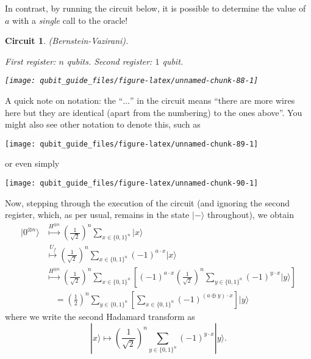 \documentclass[fleqn]{article}
\newtheorem*{circuit}{Circuit}
\begin{document}
In contrast, by running the circuit below, it is possible to determine the value of \(a\) with a \emph{single} call to the oracle!

\begin{circuit}

(Bernstein-Vazirani).

\emph{First register: \(n\) qubits. Second register: \(1\) qubit.}

\begin{center}\texttt{[image: qubit\_guide\_files/figure-latex/unnamed-chunk-88-1]} \end{center}

\end{circuit}

A quick note on notation: the ``\(\ldots\)'' in the circuit means ``there are more wires here but they are identical (apart from the numbering) to the ones above''.
You might also see other notation to denote this, such as

\begin{center}\texttt{[image: qubit\_guide\_files/figure-latex/unnamed-chunk-89-1]} \end{center}

or even simply

\begin{center}\texttt{[image: qubit\_guide\_files/figure-latex/unnamed-chunk-90-1]} \end{center}

Now, stepping through the execution of the circuit (and ignoring the second register, which, as per usual, remains in the state \(|-\rangle\) throughout), we obtain
\[
  \begin{aligned}
    |0^{\otimes n}\rangle
    &\overset{H^{\otimes n}}{\longmapsto}
    \left(\frac{1}{\sqrt{2}}\right)^n \sum_{x\in\{0,1\}^n} |x\rangle
  \\&\overset{U_f}{\longmapsto}
    \left(\frac{1}{\sqrt{2}}\right)^n \sum_{x\in\{0,1\}^n} (-1)^{a\cdot x}|x\rangle
  \\&\overset{H^{\otimes n}}{\longmapsto}
    \left(\frac{1}{\sqrt{2}}\right)^n \sum_{x\in\{0,1\}^n}
    \left[
      (-1)^{a\cdot x} \left(\frac{1}{\sqrt{2}}\right)^n
      \sum_{y\in\{0,1\}^n} (-1)^{y\cdot x} |y\rangle
    \right]
  \\&\quad= \left(\frac{1}{2}\right)^n \sum_{y\in\{0,1\}^n}
    \left[
      \sum_{x\in\{0,1\}^n} (-1)^{(a\oplus y)\cdot x}
    \right]
    |y\rangle
  \end{aligned}
\]
where we write the second Hadamard transform as
\[
  |x\rangle
  \longmapsto
  \left(\frac{1}{\sqrt{2}}\right)^n \sum_{y\in\{0,1\}^n} (-1)^{y\cdot x}|y\rangle.
\]
\end{document}
